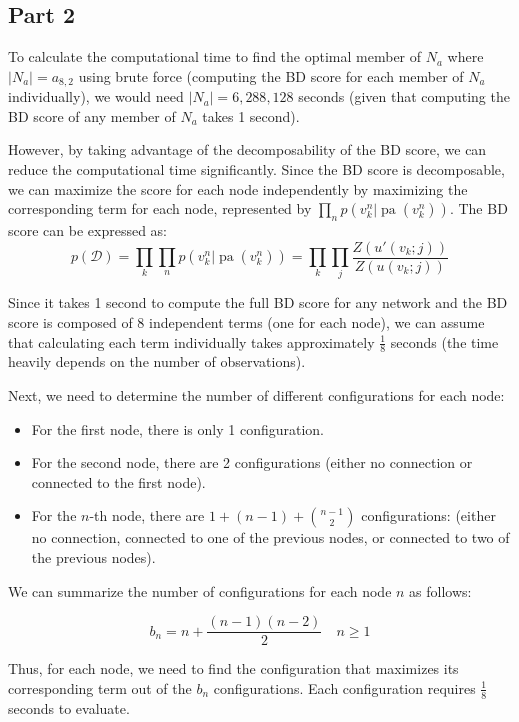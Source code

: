 \documentclass{article}
\begin{document}
\subsection*{Part 2}

To calculate the computational time to find the optimal member of \( N_a \) where \( |N_a| = a_{8,2} \) using brute force (computing the BD score for each member of \( N_a \) individually), we would need \( |N_a| = 6,288,128 \) seconds (given that computing the BD score of any member of \( N_a \) takes 1 second).

However, by taking advantage of the decomposability of the BD score, we can reduce the computational time significantly. 
Since the BD score is decomposable, we can maximize the score for each node independently by maximizing the corresponding term for each node, represented by \( \prod_n p(v_k^n | \operatorname{pa}(v_k^n)) \). The BD score can be expressed as:
\[
p(\mathcal{D}) = \prod_k \prod_n p(v_k^n | \operatorname{pa}(v_k^n)) = \prod_k \prod_j \frac{Z(u'(v_k; j))}{Z(u(v_k; j))}
\]

Since it takes 1 second to compute the full BD score for any network and the BD score is composed of 8 independent terms (one for each node), we can assume that calculating each term individually takes approximately \( \frac{1}{8} \) seconds (the time heavily depends on the number of observations).

Next, we need to determine the number of different configurations for each node:

\begin{itemize}
    \item For the first node, there is only 1 configuration.
    \item For the second node, there are 2 configurations (either no connection or connected to the first node).
    \item For the \( n \)-th node, there are \( 1 + (n-1) + \binom{n-1}{2} \) configurations:
    (either no connection, connected to one of the previous nodes, or connected to two of the previous nodes).
\end{itemize}

We can summarize the number of configurations for each node \( n \) as follows:

\[
b_n = n + \frac{(n-1)(n-2)}{2} \quad n \geq 1
\]

Thus, for each node, we need to find the configuration that maximizes its corresponding term out of the \( b_n \) configurations. Each configuration requires \( \frac{1}{8} \) seconds to evaluate.
\end{document}

